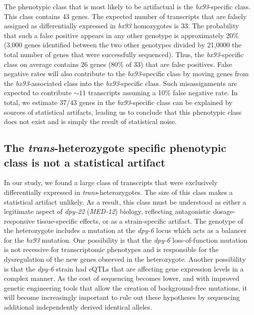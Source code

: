 \documentclass[10pt, twocolumn]{article}
\newcommand{\gene}[1]{\mbox{\emph{#1}}}
\newcommand{\dpy}{\gene{dpy-22} (\emph{MED-12})}
\begin{document}
The phenotypic class that is most likely to be artifactual is the \emph{bx93}-specific
class. This class contains 43 genes. The expected number of transcripts that
are falsely assigned as differentially expressed in \emph{bx93} homozygotes is
33. The probability that such a false positive appears in any other genotype is
approximately 20\% (3,000 genes identified between the two other genotypes divided
by 21,0000 the total number of genes that were successfully sequenced). Thus,
the \emph{bx93}-specific class on average contains 26 genes (80\% of 33) that
are false positives. False negative rates will also contribute to the
\emph{bx93}-specific class by moving genes from the \emph{bx93}-associated class
into the \emph{bx93}-specific class. Such misassignments are expected to
contribute $\sim 11$ transcripts assuming a 10\% false negative rate. In total,
we estimate 37/43 genes in the \emph{bx93}-specific class can be explained by
sources of statistical artifacts, leading us to conclude that this phenotypic
class does not exist and is simply the result of statistical noise.

\subsection*{The \emph{trans}-heterozygote specific phenotypic class is not a
             statistical artifact}
In our study, we found a large class of transcripts that were exclusively
differentially expressed in \emph{trans}-heterozygotes. The size of this class
makes a statistical artifact unlikely. As a result, this class must be
understood as either a legitimate aspect of \dpy{} biology, reflecting
antagonistic dosage-responsive tissue-specific effects, or as a strain-specific
artifact. The genotype of the heterozygote includes a mutation at the
\gene{dpy-6} locus which acts as a balancer for the \emph{bx93} mutation. One
possibility is that the \emph{dpy-6} loss-of-function mutation is not recessive
for transcriptomic phenotypes and is responsible for the dysregulation of the
new genes observed in the heterozygote. Another possibility is that the
\emph{dpy-6} strain had eQTLs that are affecting gene expression levels in a
complex manner. As the cost of sequencing becomes lower, and with improved
genetic engineering tools that allow the creation of background-free mutations,
it will become increasingly important to rule out these hypotheses by sequencing
additional independently derived identical alleles.
\end{document}
